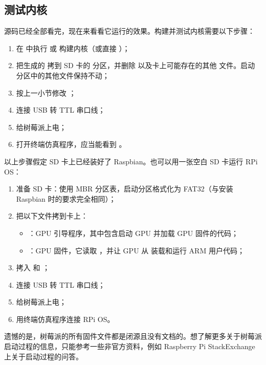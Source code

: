 \subsection{测试内核}

源码已经全部看完，现在来看看它运行的效果。构建并测试内核需要以下步骤：

\begin{enumerate}
  \item 在  中执行  或  构建内核（或直接 ）；
  \item 把生成的  拷到 SD 卡的  分区，并删除  以及卡上可能存在的其他  文件。启动分区中的其他文件保持不动；
  \item 按上一小节修改 ；
  \item 连接 USB 转 TTL 串口线；
  \item 给树莓派上电；
  \item 打开终端仿真程序，应当能看到 。
\end{enumerate}

以上步骤假定 SD 卡上已经装好了 Raspbian。也可以用一张空白 SD 卡运行 RPi OS：

\begin{enumerate}
  \item 准备 SD 卡：使用 MBR 分区表，启动分区格式化为 FAT32（与安装 Raspbian 时的要求完全相同）；
  \item 把以下文件拷到卡上：
  \begin{itemize}
    \item {}：GPU 引导程序，其中包含启动 GPU 并加载 GPU 固件的代码；
    \item {}：GPU 固件，它读取 ，并让 GPU 从  装载和运行 ARM 用户代码；
  \end{itemize}
  \item 拷入  和 ；
  \item 连接 USB 转 TTL 串口线；
  \item 给树莓派上电；
  \item 用终端仿真程序连接 RPi OS。
\end{enumerate}

遗憾的是，树莓派的所有固件文件都是闭源且没有文档的。想了解更多关于树莓派启动过程的信息，只能参考一些非官方资料，例如 Raspberry Pi StackExchange 上关于启动过程的问答。

